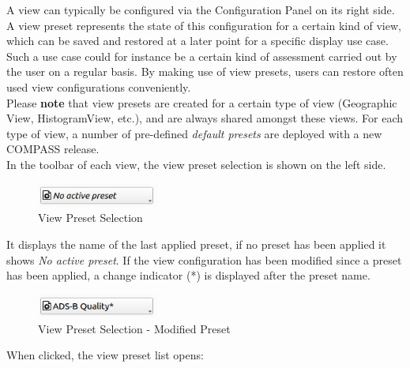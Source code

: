 A view can typically be configured via the Configuration Panel on its right side.
A view preset represents the state of this configuration for a certain kind of view,
which can be saved and restored at a later point for a specific display use case. 
Such a use case could for instance be a certain kind of assessment carried out by the user
on a regular basis. By making use of view presets, users can restore often used view configurations conveniently. \\

Please \textbf{note} that view presets are created for a certain type of view (Geographic View, HistogramView, etc.),
and are always shared amongst these views. For each type of view, a number of pre-defined \textit{default presets} are deployed with a new COMPASS release. \\

In the toolbar of each view, the view preset selection is shown on the left side. 

\begin{figure}[H]
    \center
    \includegraphics[width=4cm]{figures/view_preset_selection.png}
  \caption{View Preset Selection}
\end{figure}

It displays the name of the last applied preset, if no preset has been applied it shows \textit{No active preset}.
If the view configuration has been modified since a preset has been applied, a change indicator (*) is displayed after the preset name.

\begin{figure}[H]
    \center
    \includegraphics[width=4cm]{figures/view_preset_selection_modified.png}
  \caption{View Preset Selection - Modified Preset}
\end{figure}

When clicked, the view preset list opens:

